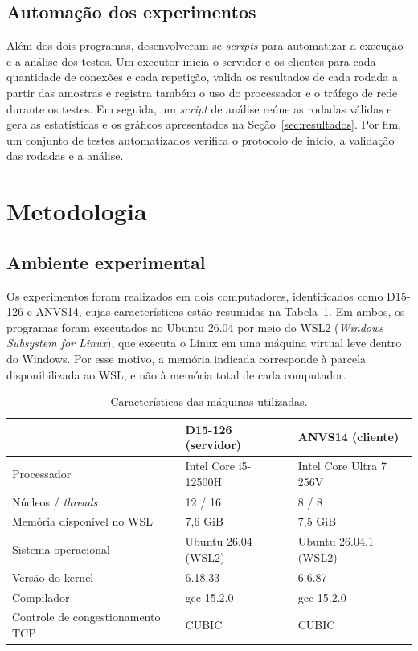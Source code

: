 \documentclass[12pt]{article}
\begin{document}
\subsection{Automação dos experimentos}

Além dos dois programas, desenvolveram-se \textit{scripts} para automatizar a
execução e a análise dos testes. Um executor inicia o servidor e os clientes
para cada quantidade de conexões e cada repetição, valida os resultados de cada
rodada a partir das amostras e registra também o uso do processador e o tráfego
de rede durante os testes. Em seguida, um \textit{script} de análise reúne as
rodadas válidas e gera as estatísticas e os gráficos apresentados na
Seção~\ref{sec:resultados}. Por fim, um conjunto de testes automatizados
verifica o protocolo de início, a validação das rodadas e a análise.

\section{Metodologia} \label{sec:metodologia}
\subsection{Ambiente experimental}

Os experimentos foram realizados em dois computadores, identificados como
D15-126 e ANVS14, cujas características estão resumidas na
Tabela~\ref{tab:ambiente}. Em ambos, os programas foram executados no Ubuntu
26.04 por meio do WSL2 (\textit{Windows Subsystem for Linux}), que executa o
Linux em uma máquina virtual leve dentro do Windows. Por esse motivo, a memória
indicada corresponde à parcela disponibilizada ao WSL, e não à memória total de
cada computador.

\begin{table}[ht]
\centering
\caption{Características das máquinas utilizadas.}
\label{tab:ambiente}
\begin{tabular}{lll}
\hline
 & \textbf{D15-126 (servidor)} & \textbf{ANVS14 (cliente)} \\
\hline
Processador & Intel Core i5-12500H & Intel Core Ultra 7 256V \\
Núcleos / \textit{threads} & 12 / 16 & 8 / 8 \\
Memória disponível no WSL & 7,6 GiB & 7,5 GiB \\
Sistema operacional & Ubuntu 26.04 (WSL2) & Ubuntu 26.04.1 (WSL2) \\
Versão do kernel & 6.18.33 & 6.6.87 \\
Compilador & gcc 15.2.0 & gcc 15.2.0 \\
Controle de congestionamento TCP & CUBIC & CUBIC \\
\hline
\end{tabular}
\end{table}
\end{document}
